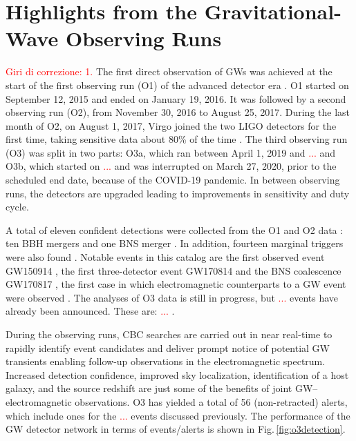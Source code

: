 \documentclass[binding=0.6cm, LaM]{sapthesis}
\newcommand{\fpg}[1]{\textcolor{red}{#1} }
\begin{document}
\chapter{Highlights from the Gravitational-Wave Observing Runs}
\label{ch:ObservingRuns}
\fpg{Giri di correzione: 1.}%
	The first direct observation of GWs was achieved at the start of the first observing run (O1) 
	of the advanced detector era \cite{52}.  
	O1 started on September 12, 2015 and ended on January 19, 2016.  
	It was followed by a second observing run (O2), 
	from November 30, 2016 to August 25, 2017.  
	During the last month of O2, on August 1, 2017, Virgo joined the two LIGO detectors for the first time, 	
	taking sensitive data about 80\% of the time \cite{13}.  
	The third observing run (O3) was split in two parts: O3a, which ran between April 1, 2019 and \fpg{...} and O3b, 
	which started on \fpg{...} and was interrupted on March 27, 2020, prior to the scheduled end date, 
	because of the COVID-19 pandemic.  
	In between observing runs, the detectors are upgraded leading to improvements in sensitivity and duty cycle.

	A total of eleven confident detections were collected from the O1 and O2 data \cite{13}: 
	ten BBH mergers \cite{14, 52, 58-60} and one BNS merger \cite{61}.  
	In addition, fourteen marginal triggers were also found \cite{13}.
	Notable events in this catalog are the first observed event GW150914 \cite{52},
	the first three-detector event GW170814 \cite{60} and the BNS
	coalescence GW170817 \cite{62}, the first case in which electromagnetic counterparts to a GW event 
	were observed \cite{15}.
        The analyses of O3 data is still in progress, but \fpg{...} events have already been announced.  These are: \fpg{...}.

	During the observing runs, CBC searches are carried out in near real-time 
	to rapidly identify event candidates and deliver prompt notice of potential GW transients 
	enabling follow-up observations in the electromagnetic spectrum. 
	Increased detection confidence, improved sky localization, identification of a host galaxy, 
	and the source redshift are just some of the benefits of joint GW–electromagnetic observations.  
	O3 has yielded a total of 56 (non-retracted) alerts, which include ones for the \fpg{...} events discussed previously.  
	The performance of the GW detector network in terms of events/alerts is shown in Fig.\,\ref{fig:o3detection}. 
\end{document}
